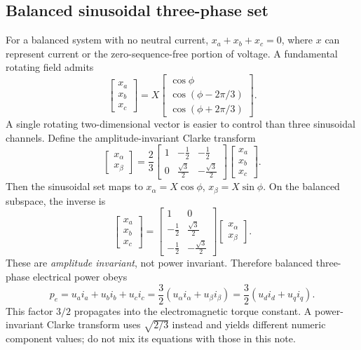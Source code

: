 \documentclass[10pt,letterpaper]{article}
\begin{document}
\subsection{Balanced sinusoidal three-phase set}
For a balanced system with no neutral current, $x_a+x_b+x_c=0$, where $x$ can represent current or the zero-sequence-free portion of voltage. A fundamental rotating field admits
\begin{equation}
\begin{bmatrix}x_a\\x_b\\x_c\end{bmatrix}
=X\begin{bmatrix}\cos\phi\\\cos(\phi-2\pi/3)\\\cos(\phi+2\pi/3)\end{bmatrix}.
\end{equation}
A single rotating two-dimensional vector is easier to control than three sinusoidal channels. Define the amplitude-invariant Clarke transform
\begin{equation}\label{eq:clarke}
\begin{bmatrix}x_\alpha\\x_\beta\end{bmatrix}
=\frac{2}{3}\begin{bmatrix}1&-\frac12&-\frac12\\0&\frac{\sqrt3}{2}&-\frac{\sqrt3}{2}\end{bmatrix}
\begin{bmatrix}x_a\\x_b\\x_c\end{bmatrix}.
\end{equation}
Then the sinusoidal set maps to $x_\alpha=X\cos\phi$, $x_\beta=X\sin\phi$. On the balanced subspace, the inverse is
\begin{equation}\label{eq:invclarke}
\begin{bmatrix}x_a\\x_b\\x_c\end{bmatrix}
=\begin{bmatrix}1&0\\-\frac12&\frac{\sqrt3}{2}\\-\frac12&-\frac{\sqrt3}{2}\end{bmatrix}
\begin{bmatrix}x_\alpha\\x_\beta\end{bmatrix}.
\end{equation}
These are \emph{amplitude invariant}, not power invariant. Therefore balanced three-phase electrical power obeys
\begin{equation}\label{eq:power}
p_e=u_ai_a+u_bi_b+u_ci_c=\frac32(u_\alpha i_\alpha+u_\beta i_\beta)=\frac32(u_di_d+u_qi_q).
\end{equation}
This factor $3/2$ propagates into the electromagnetic torque constant. A power-invariant Clarke transform uses $\sqrt{2/3}$ instead and yields different numeric component values; do not mix its equations with those in this note.
\end{document}
